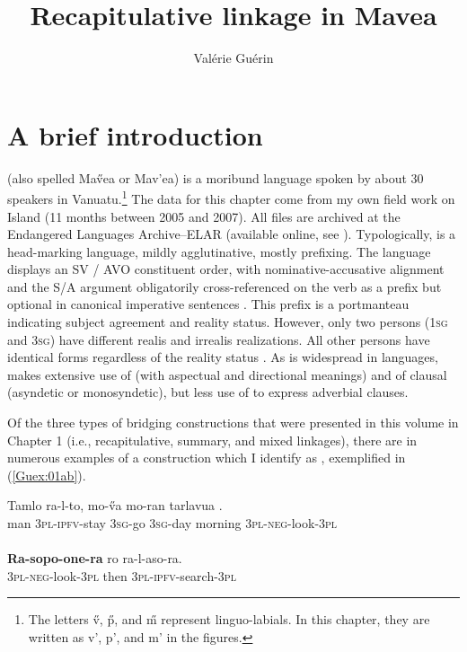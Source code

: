 \documentclass[output=paper]{LSP/langsci}
\author{
   Valérie Guérin\affiliation{James Cook University}
}
\title{Recapitulative linkage in Mavea}
\begin{document}
\label{ch:8}

\section{A brief introduction} 
\label{Gusec:Introduction}
 (also spelled Ma\H{v}ea or Mav'ea) is a moribund  language spoken by about 30 speakers in Vanuatu.\footnote{The letters \H{v}, \H{p}, and \H{m} represent linguo-labials. In this chapter, they are written as v', p', and m' in the figures.} The data for this chapter come from my own field work on  Island (11 months between 2005 and 2007). All files are archived at the Endangered Languages Archive--ELAR (available online, see \citealt{guerin06}). Typologically,  is a head-marking language, mildly agglutinative, mostly prefixing. The language displays an SV / AVO constituent order, with nominative-accusative alignment and the S/A argument obligatorily cross-referenced on the verb as a prefix but optional in canonical imperative sentences \citep[][236]{guerin11}. This prefix is a portmanteau indicating subject agreement and reality status. However, only two persons (\textsc{1sg} and \textsc{3sg}) have different realis and irrealis realizations. All other persons have identical forms regardless of the reality status \citep[][61]{guerin11}. As is widespread in  languages,  makes extensive use of  (with aspectual and directional meanings) and of clausal  (asyndetic or monosyndetic), but less use of  to express adverbial clauses. 

Of the three types of bridging constructions that were presented in this volume in Chapter 1 (i.e., recapitulative, summary, and mixed linkages), there are in  numerous examples of a construction which I identify as , exemplified in (\ref{Guex:01ab}). 

\begin{exe}
\ex \label{Guex:01ab}
\begin{xlist}
\ex \label{Guex:01a}
\gll Tamlo   ra-l-to,            mo-\H{v}a    mo-ran      tarlavua  \underline{}.\\
man     \textsc{3pl}-\textsc{ipfv}-stay   \textsc{3sg}-go     \textsc{3sg}-day   morning  \textsc{3pl-neg}-look-\textsc{3pl}\\
\glt {}\\
\ex \label{Guex:01b}
\gll \textbf{Ra-sopo-one-ra} ro      ra-l-aso-ra.\\     	       
    \textsc{3pl-neg}-look-\textsc{3pl}   then  \textsc{3pl-ipfv}-search-\textsc{3pl}\\
\glt {} 
\end{xlist}
\end{exe}
\end{document}

